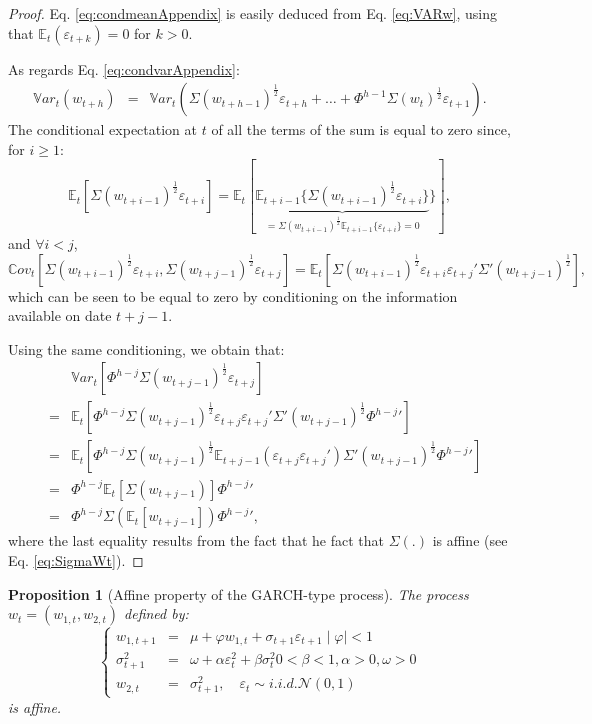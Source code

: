 \documentclass[
  12pt,
]{book}
\newtheorem{proposition}{Proposition}[chapter]
\theoremstyle{definition}
\theoremstyle{definition}
\theoremstyle{definition}
\theoremstyle{definition}
\theoremstyle{remark}
\begin{document}
\begin{proof}
Eq. \eqref{eq:condmeanAppendix} is easily deduced from Eq. \eqref{eq:VARw}, using that \(\mathbb{E}_t(\varepsilon_{t+k})=0\) for \(k>0\).

As regards Eq. \eqref{eq:condvarAppendix}:
\begin{eqnarray*}
\mathbb{V}ar_t(w_{t+h}) &=& \mathbb{V}ar_t\left(\Sigma(w_{t+h-1})^{\frac{1}{2}}\varepsilon_{t+h}+\dots + \Phi^{h-1} \Sigma(w_{t})^{\frac{1}{2}}\varepsilon_{t+1} \right).
\end{eqnarray*}
The conditional expectation at \(t\) of all the terms of the sum is equal to zero since, for \(i \ge 1\):
\[
\mathbb{E}_t\left[\Sigma(w_{t+i-1})^{\frac{1}{2}}\varepsilon_{t+i}\right] = \mathbb{E}_t[\underbrace{\mathbb{E}_{t+i-1}\{\Sigma(w_{t+i-1})^{\frac{1}{2}}\varepsilon_{t+i}\}}_{=\Sigma(w_{t+i-1})^{\frac{1}{2}}\mathbb{E}_{t+i-1}\{\varepsilon_{t+i}\}=0}\}],
\]
and \(\forall i <j\),
\[
\mathbb{C}ov_t\left[\Sigma(w_{t+i-1})^{\frac{1}{2}}\varepsilon_{t+i},\Sigma(w_{t+j-1})^{\frac{1}{2}}\varepsilon_{t+j}\right] = \mathbb{E}_t\left[\Sigma(w_{t+i-1})^{\frac{1}{2}}\varepsilon_{t+i}\varepsilon_{t+j}'\Sigma'(w_{t+j-1})^{\frac{1}{2}}\right],
\]
which can be seen to be equal to zero by conditioning on the information available on date \(t+j-1\).

Using the same conditioning, we obtain that:
\begin{eqnarray*}
&&\mathbb{V}ar_t\left[\Phi^{h-j}\Sigma(w_{t+j-1})^{\frac{1}{2}}\varepsilon_{t+j}\right]\\
&=& \mathbb{E}_t\left[\Phi^{h-j}\Sigma(w_{t+j-1})^{\frac{1}{2}}\varepsilon_{t+j}\varepsilon_{t+j}'\Sigma'(w_{t+j-1})^{\frac{1}{2}}{\Phi^{h-j}}'\right] \\
&=&  \mathbb{E}_t\left[\Phi^{h-j}\Sigma(w_{t+j-1})^{\frac{1}{2}} \mathbb{E}_{t+j-1}(\varepsilon_{t+j}\varepsilon_{t+j}')\Sigma'(w_{t+j-1})^{\frac{1}{2}}{\Phi^{h-j}}'\right] \\
&=&  \Phi^{h-j}\mathbb{E}_t[\Sigma(w_{t+j-1})]{\Phi^{h-j}}' \\
&=&  \Phi^{h-j}\Sigma(\mathbb{E}_t[w_{t+j-1}]){\Phi^{h-j}}',
\end{eqnarray*}
where the last equality results from the fact that he fact that \(\Sigma(.)\) is affine (see Eq. \eqref{eq:SigmaWt}).
\end{proof}

\begin{proposition}[Affine property of the GARCH-type process]
\protect\hypertarget{prp:GARCH}{}\label{prp:GARCH}The process \(w_t = (w_{1,t}, w_{2,t})\) defined by:
\[
\left\{
\begin{array}{ccl}
w_{1, t+1} &=& \mu + \varphi w_{1,t} + \sigma_{t+1} \varepsilon_{t+1}    \mid \varphi \mid < 1 \\
\sigma^2_{t+1} &=& \omega + \alpha \varepsilon^2_t + \beta \sigma^2_t      0 < \beta < 1, \alpha > 0, \omega > 0    \\
w_{2,t} &=& \sigma^2_{t+1}, \quad \varepsilon_t \sim   i.i.d.   \mathcal{N}(0,1)
\end{array}
\right.
\]
is affine.
\end{proposition}
\end{document}
